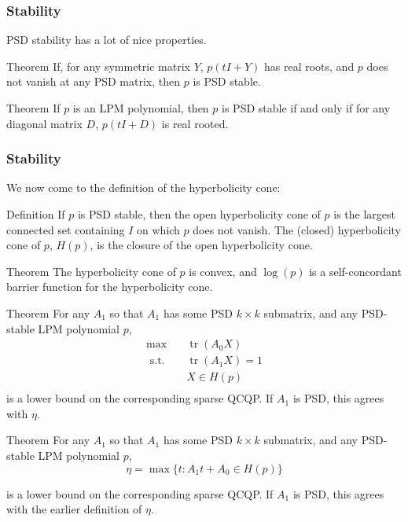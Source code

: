 \documentclass{beamer}
\DeclareMathOperator{\tr}{tr}
\newcommand{\st}{{\text{ s.t. }}}
\begin{document}
\begin{frame}
\frametitle{Stability}
PSD stability has a lot of nice properties.
\begin{block}{Theorem}
    If, for any symmetric matrix $Y$, $p(tI+Y)$ has real roots, and $p$ does not vanish at any PSD matrix, then $p$ is PSD stable.
\end{block}
\pause
\begin{block}{Theorem}
    If $p$ is an LPM polynomial, then $p$ is PSD stable if and only if for any diagonal matrix $D$, $p(tI+D)$ is real rooted.
\end{block}
\end{frame}

\begin{frame}
\frametitle{Stability}
We now come to the definition of the hyperbolicity cone:
\begin{block}{Definition}
    If $p$ is PSD stable, then the open hyperbolicity cone of $p$ is the largest connected set containing $I$ on which  $p$ does not vanish. The (closed) hyperbolicity cone of $p$, $H(p)$, is the closure of the open hyperbolicity cone.
\end{block}
\begin{block}{Theorem}
    The hyperbolicity cone of $p$ is convex, and $\log(p)$ is a self-concordant barrier function for the hyperbolicity cone.
\end{block}
\end{frame}
\begin{frame}
    \begin{block}{Theorem}
        For any $A_1$ so that $A_1$ has some PSD $k\times k$ submatrix, and any PSD-stable LPM polynomial $p$,
        \begin{equation}
            \begin{aligned}
                \max\quad & \tr(A_0X)\\
                \st & \tr(A_1X) = 1\\
                    & X \in H(p)\\
            \end{aligned}
        \end{equation}
        is a lower bound on the corresponding sparse QCQP.
        If $A_1$ is PSD, this agrees with $\eta$.
    \end{block}
\end{frame}
\begin{frame}
    \begin{block}{Theorem}
        For any $A_1$ so that $A_1$ has some PSD $k\times k$ submatrix, and any PSD-stable LPM polynomial $p$,
        \[
            \eta = \max \{t : A_1t + A_0 \in H(p) \}
        \]

        is a lower bound on the corresponding sparse QCQP.
        If $A_1$ is PSD, this agrees with the earlier definition of $\eta$.
    \end{block}
\end{frame}
\end{document}
